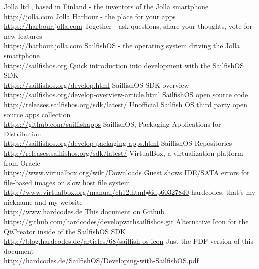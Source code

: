 \begin{thebibliography}{xxxxxxxxxxxx}
%
%
  Jolla ltd., based in Finland - the inventors of the Jolla smartphone \\\url{http://jolla.com}
 Jolla Harbour - the place for your apps \\\url{https://harbour.jolla.com}
 Together - ask questions, share your thoughts, vote for new features \\\url{https://harbour.jolla.com}
	SailfishOS - the operating system driving the Jolla smartphone \\\url{https://sailfishos.org}
 Quick introduction into development with the SailfishOS SDK \\\url{https://sailfishos.org/develop.html}
 SailfishOS SDK overview \\\url{https://sailfishos.org/develop-overview-article.html}
 SailfishOS open source code \\\url{http://releases.sailfishos.org/sdk/latest/}
 Unofficial Sailfish OS third party open source apps collection \\\url{https://github.com/sailfishapps}
 SailfishOS, Packaging Applications for Distribution\\\url{https://sailfishos.org/develop-packaging-apps.html}
 SailfishOS Repositories \\\url{http://releases.sailfishos.org/sdk/latest/}
%
%
 VirtualBox, a virtualization platform from Oracle\\\url{https://www.virtualbox.org/wiki/Downloads}
 Guest shows IDE/SATA errors for file-based images on slow host file system\\\url{http://www.virtualbox.org/manual/ch12.html#idp60327840}
%
%
 hardcodes, that's my nickname and my website\\\url{http://www.hardcodes.de}
 This document on Github\\\url{https://github.com/hardcodes/developwithsailfishos.git}
 Alternative Icon for the QtCreator inside of the SailfishOS SDK\\\url{http://blog.hardcodes.de/articles/68/sailfish-os-icon}
 Just the PDF version of this document \\\url{http://hardcodes.de/SailfishOS/Developing-with-SailfishOS.pdf}

\end{thebibliography}
